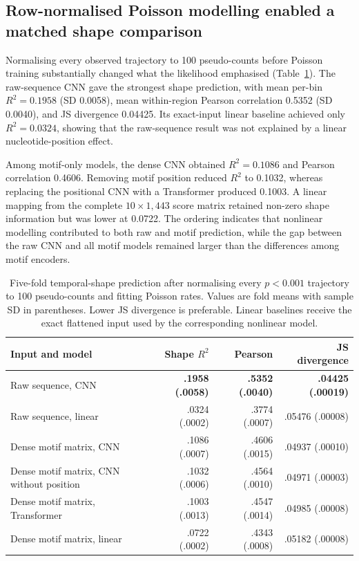 \documentclass[a4paper,12pt]{article}
\begin{document}
\subsection{Row-normalised Poisson modelling enabled a matched shape comparison}

Normalising every observed trajectory to 100 pseudo-counts before Poisson training substantially changed what the likelihood emphasised (Table~\ref{tab:normalisedpoisson}). The raw-sequence CNN gave the strongest shape prediction, with mean per-bin $R^2=0.1958$ (SD 0.0058), mean within-region Pearson correlation 0.5352 (SD 0.0040), and JS divergence 0.04425. Its exact-input linear baseline achieved only $R^2=0.0324$, showing that the raw-sequence result was not explained by a linear nucleotide-position effect.

Among motif-only models, the dense CNN obtained $R^2=0.1086$ and Pearson correlation 0.4606. Removing motif position reduced $R^2$ to 0.1032, whereas replacing the positional CNN with a Transformer produced 0.1003. A linear mapping from the complete $10\times1{,}443$ score matrix retained non-zero shape information but was lower at 0.0722. The ordering indicates that nonlinear modelling contributed to both raw and motif prediction, while the gap between the raw CNN and all motif models remained larger than the differences among motif encoders.

\begin{table}[htbp]
\centering
\caption{Five-fold temporal-shape prediction after normalising every $p<0.001$ trajectory to 100 pseudo-counts and fitting Poisson rates. Values are fold means with sample SD in parentheses. Lower JS divergence is preferable. Linear baselines receive the exact flattened input used by the corresponding nonlinear model.}
\label{tab:normalisedpoisson}
\small
\begin{tabular}{lrrr}
\toprule
Input and model & Shape $R^2$ & Pearson & JS divergence \\
\midrule
Raw sequence, CNN & \textbf{.1958 (.0058)} & \textbf{.5352 (.0040)} & \textbf{.04425 (.00019)} \\
Raw sequence, linear & .0324 (.0002) & .3774 (.0007) & .05476 (.00008) \\
Dense motif matrix, CNN & .1086 (.0007) & .4606 (.0015) & .04937 (.00010) \\
Dense motif matrix, CNN without position & .1032 (.0006) & .4564 (.0010) & .04971 (.00003) \\
Dense motif matrix, Transformer & .1003 (.0013) & .4547 (.0014) & .04985 (.00008) \\
Dense motif matrix, linear & .0722 (.0002) & .4343 (.0008) & .05182 (.00008) \\
\bottomrule
\end{tabular}
\end{table}
\end{document}
